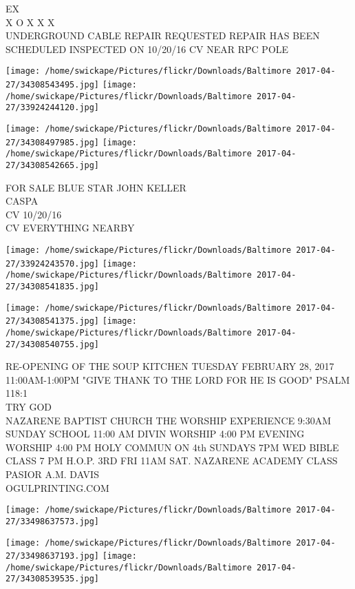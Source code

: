 \documentclass[10pt,letterpaper]{article}
\begin{document}
EX\\
X O X X X\\
UNDERGROUND CABLE REPAIR REQUESTED REPAIR HAS BEEN SCHEDULED INSPECTED ON 10/20/16 CV NEAR RPC POLE
\pagebreak

\texttt{[image: /home/swickape/Pictures/flickr/Downloads/Baltimore 2017-04-27/34308543495.jpg]}
\texttt{[image: /home/swickape/Pictures/flickr/Downloads/Baltimore 2017-04-27/33924244120.jpg]}

\texttt{[image: /home/swickape/Pictures/flickr/Downloads/Baltimore 2017-04-27/34308497985.jpg]}
\texttt{[image: /home/swickape/Pictures/flickr/Downloads/Baltimore 2017-04-27/34308542665.jpg]}

FOR SALE BLUE STAR JOHN KELLER\\
CASPA\\
CV 10/20/16\\
CV EVERYTHING NEARBY
\pagebreak

\texttt{[image: /home/swickape/Pictures/flickr/Downloads/Baltimore 2017-04-27/33924243570.jpg]}
\texttt{[image: /home/swickape/Pictures/flickr/Downloads/Baltimore 2017-04-27/34308541835.jpg]}

\texttt{[image: /home/swickape/Pictures/flickr/Downloads/Baltimore 2017-04-27/34308541375.jpg]}
\texttt{[image: /home/swickape/Pictures/flickr/Downloads/Baltimore 2017-04-27/34308540755.jpg]}

RE{-}OPENING OF THE SOUP KITCHEN TUESDAY FEBRUARY 28, 2017 11:00AM{-}1:00PM "GIVE THANK TO THE LORD FOR HE IS GOOD" PSALM 118:1\\
TRY GOD\\
NAZARENE BAPTIST CHURCH THE WORSHIP EXPERIENCE 9:30AM SUNDAY SCHOOL 11:00 AM DIVIN WORSHIP 4:00 PM EVENING WORSHIP 4:00 PM HOLY COMMUN ON 4th SUNDAYS 7PM WED BIBLE CLASS 7 PM H.O.P. 3RD FRI 11AM SAT. NAZARENE ACADEMY CLASS PASIOR A.M. DAVIS\\
OGULPRINTING.COM
\pagebreak

\texttt{[image: /home/swickape/Pictures/flickr/Downloads/Baltimore 2017-04-27/33498637573.jpg]}

\vspace{0.25in}
\texttt{[image: /home/swickape/Pictures/flickr/Downloads/Baltimore 2017-04-27/33498637193.jpg]}
\texttt{[image: /home/swickape/Pictures/flickr/Downloads/Baltimore 2017-04-27/34308539535.jpg]}
\end{document}
